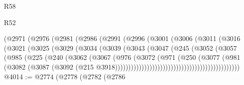 \begin{lexlean}{R58}
\begin{lexlean}{R52}
\begin{coremodule}
{{{{{{{{{{{{{{{{{{{{{{{{{{{{{{{{{{{{{{{{{{{{{{{{{{{{{{{{{{{{{{{{{{{{{{{{{{{{{{{{{{{{{{{{{{{{{{{{{{{{{{{{{{{{{{{{{{{{{{{{{{{{{{{{{{{{{{{{{{{{{{{{{{{{{{{{{{{{{{{{{{{{{{{{{{{{{{{{{{{{{{{{{{{{{{{{{{{{{{                            (@2971
                              (@2976
                                (@2981
                                  (@2986
                                    (@2991
                                      (@2996
                                        (@3001
                                          (@3006
                                            (@3011
                                              (@3016
                                                (@3021
                                                  (@3025
                                                    (@3029
                                                      (@3034
                                                        (@3039
                                                          (@3043
                                                            (@3047
                                                              (@245
                                                                (@3052
                                                                  (@3057
                                                                    (@985
                                                                      (@225
                                                                        (@240
                                                                          (@3062
                                                                            (@3067
                                                                              (@976
                                                                                (@3072
                                                                                  (@971
                                                                                    (@250
                                                                                      (@3077
                                                                                        (@981
                                                                                          (@3082
                                                                                            (@3087
                                                                                              (@3092
                                                                                                (@215
                                                                                                  @3918)))))))))))))))))))))))))))))))))))))))))))))))
@4014 := @2774
    (@2778
      (@2782
        (@2786
}}}}}}}}}}}}}}}}}}}}}}}}}}}}}}}}}}}}}}}}}}}}}}}}}}}}}}}}}}}}}}}}}}}}}}}}}}}}}}}}}}}}}}}}}}}}}}}}}}}}}}}}}}}}}}}}}}}}}}}}}}}}}}}}}}}}}}}}}}}}}}}}}}}}}}}}}}}}}}}}}}}}}}}}}}}}}}}}}}}}}}}}}}}}}}}}}}}}}}
\end{coremodule}
\end{lexlean}
\end{lexlean}
